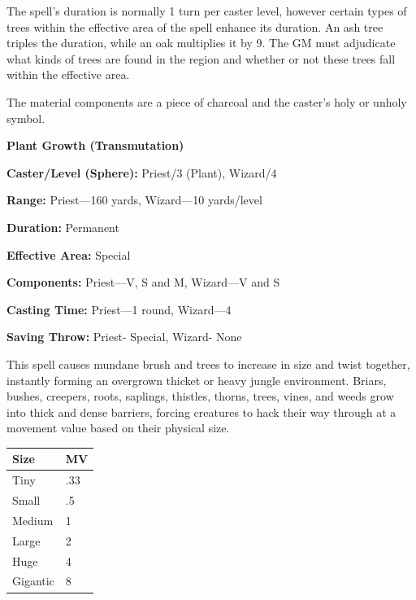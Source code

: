 \begin{multicols}{2}
The spell's duration is normally 1 turn per caster level, however certain types of trees within the effective area of the spell enhance its duration.  An ash tree triples the duration, while an oak multiplies it by 9.  The GM must adjudicate what kinds of trees are found in the region and whether or not these trees fall within the effective area.

The material components are a piece of charcoal and the caster's holy or unholy symbol.

\vspace{1em}

\noindent
\begin{minipage}{\columnwidth}

\noindent \textbf{Plant Growth (Transmutation)}

\noindent \textbf{Caster/Level (Sphere):} Priest/3 (Plant), Wizard/4

\noindent \textbf{Range:} Priest---160 yards, Wizard---10 yards/level

\noindent \textbf{Duration:} Permanent

\noindent \textbf{Effective Area:} Special

\noindent \textbf{Components:} Priest---V, S and M, Wizard---V and S

\noindent \textbf{Casting Time:} Priest---1 round, Wizard---4

\noindent \textbf{Saving Throw:} Priest- Special, Wizard- None

\end{minipage}

This spell causes mundane brush and trees to increase in size and twist together, instantly forming an overgrown thicket or heavy jungle environment.  Briars, bushes, creepers, roots, saplings, thistles, thorns, trees, vines, and weeds grow into thick and dense barriers, forcing creatures to hack their way through at a movement value based on their physical size.

\noindent
\begin{tabular}{|p{}|p{}|}
\hline
Size	& MV \\
\hline\hline
\rowcolor[gray]{.9}Tiny	& .33 \\
Small	& .5 \\
\rowcolor[gray]{.9}Medium	& 1 \\
Large	& 2 \\
\rowcolor[gray]{.9}Huge	& 4 \\
Gigantic	& 8 \\
\hline
\end{tabular}


\end{multicols}
